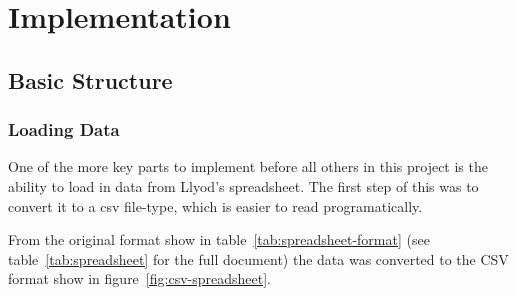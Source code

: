 \chapter{Implementation}



\section{Basic Structure}

\subsection{Loading Data}
One of the more key parts to implement before all others in this project is the ability to load in
data from Llyod's spreadsheet. The first step of this was to convert it to a \gls{csv} file-type,
which is easier to read programatically.

From the original format show in table~\ref{tab:spreadsheet-format} (see 
table~\ref{tab:spreadsheet} for the full document) the data was converted to the CSV format show
in figure~\ref{fig:csv-spreadsheet}.

\begin{table}[h]
\caption{Format of the Data Spreadsheet}\label{tab:spreadsheet-format}
\end{table}

